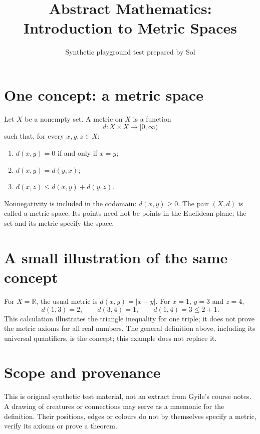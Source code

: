 \documentclass[11pt]{article}
\title{Abstract Mathematics: Introduction to Metric Spaces}
\author{Synthetic playground test prepared by Sol}
\date{}
\begin{document}
\maketitle

\section*{One concept: a metric space}
Let $X$ be a nonempty set. A metric on $X$ is a function
\[
 d:X\times X\longrightarrow [0,\infty)
\]
such that, for every $x,y,z\in X$:
\begin{enumerate}
 \item $d(x,y)=0$ if and only if $x=y$;
 \item $d(x,y)=d(y,x)$;
 \item $d(x,z)\leq d(x,y)+d(y,z)$.
\end{enumerate}
Nonnegativity is included in the codomain: $d(x,y)\geq 0$.
The pair $(X,d)$ is called a metric space. Its points need not be
points in the Euclidean plane; the set and its metric specify the space.

\section*{A small illustration of the same concept}
For $X=\mathbb{R}$, the usual metric is $d(x,y)=|x-y|$.
For $x=1$, $y=3$ and $z=4$,
\[
 d(1,3)=2,\qquad d(3,4)=1,\qquad d(1,4)=3\leq 2+1.
\]
This calculation illustrates the triangle inequality for one triple;
it does not prove the metric axioms for all real numbers.
The general definition above, including its universal quantifiers,
is the concept; this example does not replace it.

\section*{Scope and provenance}
This is original synthetic test material, not an extract from Gyile's
course notes. A drawing of creatures or connections may serve as a
mnemonic for the definition. Their positions, edges or colours do not
by themselves specify a metric, verify its axioms or prove a theorem.
\end{document}
